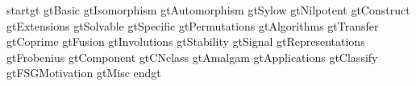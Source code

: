  {startgt}
 {gtBasic}
 {gtIsomorphism}
 {gtAutomorphism}
 {gtSylow}
 {gtNilpotent}
 {gtConstruct}
 {gtExtensions}
 {gtSolvable}
 {gtSpecific}
 {gtPermutations}
 {gtAlgorithms}
 {gtTransfer}
 {gtCoprime}
 {gtFusion}
 {gtInvolutions}
 {gtStability}
 {gtSignal}
 {gtRepresentations}
 {gtFrobenius}
 {gtComponent}
 {gtCNclass}
 {gtAmalgam}
 {gtApplications}
 {gtClassify}
 {gtFSGMotivation}
 {gtMisc}
 {endgt}

